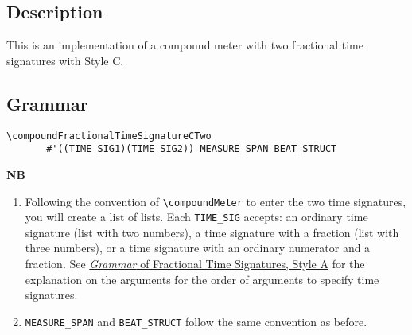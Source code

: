 \hfill
{}
\hfill

\subsection{Description}
This is an implementation of a compound meter with two fractional time signatures with Style C.  

\subsection{Grammar}
\begin{verbatim}
\compoundFractionalTimeSignatureCTwo 
       #'((TIME_SIG1)(TIME_SIG2)) MEASURE_SPAN BEAT_STRUCT
\end{verbatim}
\textbf{NB} 
\begin{enumerate}
\item Following the convention of \verb|\compoundMeter| to enter the two time signatures, you will create a list of lists. Each \verb|TIME_SIG| accepts: an ordinary time signature (list with two numbers), a time signature with a fraction (list with three numbers), or a time signature with an ordinary numerator and a fraction. See \hyperref[sec:time_signatures_styleA_convention]{\textit{Grammar} of Fractional Time Signatures, Style A} for the explanation on the arguments for the order of arguments to specify time signatures.
\item \verb|MEASURE_SPAN| and \verb|BEAT_STRUCT| follow the same convention as before.
\end{enumerate}
